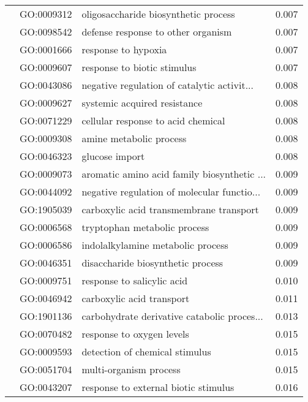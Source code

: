 \begin{longtable}{lllr}
   & GO:0009312 &         oligosaccharide biosynthetic process &         0.007 \\
   & GO:0098542 &           defense response to other organism &         0.007 \\
   & GO:0001666 &                          response to hypoxia &         0.007 \\
   & GO:0009607 &                  response to biotic stimulus &         0.007 \\
   & GO:0043086 &  negative regulation of catalytic activit... &         0.008 \\
   & GO:0009627 &                 systemic acquired resistance &         0.008 \\
   & GO:0071229 &           cellular response to acid chemical &         0.008 \\
   & GO:0009308 &                      amine metabolic process &         0.008 \\
   & GO:0046323 &                               glucose import &         0.008 \\
   & GO:0009073 &  aromatic amino acid family biosynthetic ... &         0.009 \\
   & GO:0044092 &  negative regulation of molecular functio... &         0.009 \\
   & GO:1905039 &      carboxylic acid transmembrane transport &         0.009 \\
   & GO:0006568 &                 tryptophan metabolic process &         0.009 \\
   & GO:0006586 &            indolalkylamine metabolic process &         0.009 \\
   & GO:0046351 &            disaccharide biosynthetic process &         0.009 \\
   & GO:0009751 &                   response to salicylic acid &         0.010 \\
   & GO:0046942 &                    carboxylic acid transport &         0.011 \\
   & GO:1901136 &  carbohydrate derivative catabolic proces... &         0.013 \\
   & GO:0070482 &                    response to oxygen levels &         0.015 \\
   & GO:0009593 &               detection of chemical stimulus &         0.015 \\
   & GO:0051704 &                       multi-organism process &         0.015 \\
   & GO:0043207 &         response to external biotic stimulus &         0.016 \\

\end{longtable}
